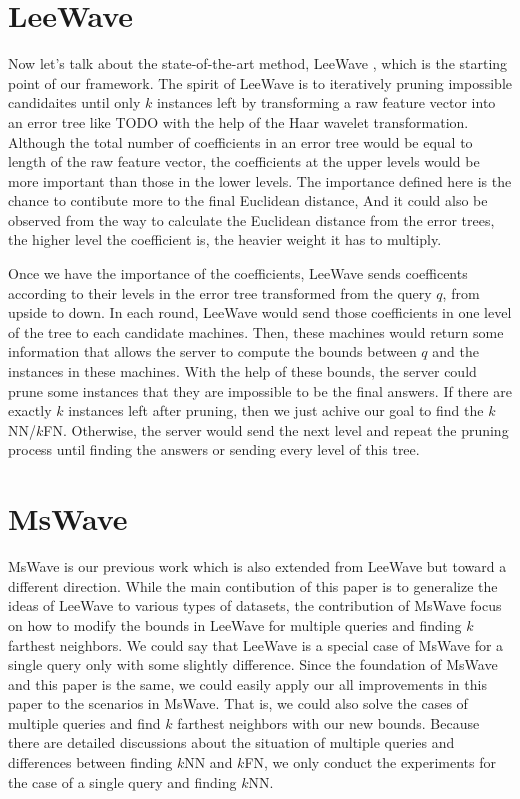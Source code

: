 \section{LeeWave} %
\label{s:leewave}
Now let's talk about the state-of-the-art method, LeeWave \cite{LeeWave}, which is the starting point of our framework. The spirit of LeeWave is to iteratively pruning impossible candidaites until only $k$ instances left by transforming a raw feature vector into an error tree like TODO with the help of the Haar wavelet transformation. Although the total number of coefficients in an error tree would be equal to length of the raw feature vector, the coefficients at the upper levels would be more important than those in the lower levels.  The importance defined here is the chance to contibute more to the final Euclidean distance,  And it could also be observed from the way to calculate the Euclidean distance from the error trees, the higher level the coefficient is, the heavier weight it has to multiply.

Once we have the importance of the coefficients, LeeWave sends coefficents according to their levels in the error tree transformed from the query $q$, from upside to down. In each round, LeeWave would send those coefficients in one level of the tree to each candidate machines.  Then, these machines would return some information that allows the server to compute the bounds between $q$ and the instances in these machines.  With the help of these bounds, the server could prune some instances that they are impossible to be the final answers.  If there are exactly $k$ instances left after pruning, then we just achive our goal to find the $k$NN/$k$FN.  Otherwise, the server would send the next level and repeat the pruning process until finding the answers or sending every level of this tree.

\section{MsWave} %
\label{s:mswave}
MsWave \cite{MsWave} is our previous work which is also extended from LeeWave but toward a different direction.  While the main contibution of this paper is to generalize the ideas of LeeWave to various types of datasets, the contribution of MsWave focus on how to modify the bounds in LeeWave for multiple queries and finding $k$ farthest neighbors.  We could say that LeeWave is a special case of MsWave for a single query only with some slightly difference.  Since the foundation of MsWave and this paper is the same, we could easily apply our all improvements in this paper to the scenarios in MsWave.  That is, we could also solve the cases of multiple queries and find $k$ farthest neighbors with our new bounds.  Because there are detailed discussions about the situation of multiple queries and differences between finding $k$NN and $k$FN, we only conduct the experiments for the case of a single query and finding $k$NN.

